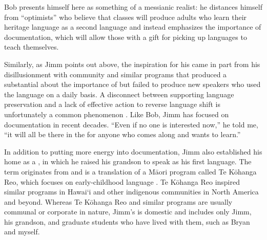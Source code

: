 \documentclass[output=paper]{LSP/langsci}
\begin{document}
Bob presents himself here as something of a messianic realist: he distances himself from ``optimists'' who believe that classes will produce adults who learn their heritage language as a second language and instead emphasizes the importance of documentation, which will allow those with a gift for picking up languages to teach themselves. 

Similarly, as Jimm points out above, the inspiration for his  came in part from his disillusionment with community  and similar programs that produced a substantial  about the importance of  but failed to produce new speakers who used the language on a daily basis. A disconnect between  supporting language preservation and a lack of effective action to reverse language shift is unfortunately a common phenomenon \citep[see e.g.][]{DauenhauerDauenhauer1998}. Like Bob, Jimm has focused on documentation in recent decades. ``Even if no one is interested now,'' he told me, ``it will all be there in the  for anyone who comes along and wants to learn.''

In addition to putting more energy into documentation, Jimm also established his home as a , in which he raised his grandson to speak  as his first language. The term  originates from and is a translation of a M\=aori  program called Te K\=ohanga Reo, which focuses on early-childhood language  \citep{King2008}. Te K\=ohanga Reo inspired similar programs in Hawai`i \citep{Warner2008, WilsonKamana2008} and other indigenous communities in North America and beyond. Whereas Te K\=ohanga Reo and similar programs are usually communal or corporate in nature, Jimm's  is domestic and includes only Jimm, his grandson, and graduate students who have lived with them, such as Bryan and myself.
\end{document}
